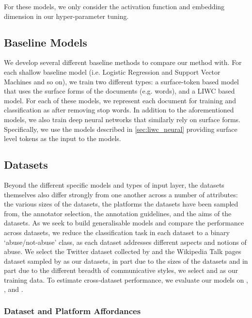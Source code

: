 For these models, we only consider the activation function and embedding dimension in our hyper-parameter tuning.

\subsection{Baseline Models}

We develop several different baseline methods to compare our method with. For each shallow baseline model (i.e. Logistic Regression and Support Vector Machines and so on), we train two different types: a surface-token based model that uses the surface forms of the documents (e.g. words), and a LIWC based model. For each of these models, we represent each document for training and classification as  after removing stop words. In addition to the aforementioned models, we also train deep neural networks that similarly rely on surface forms. Specifically, we use the models described in \autoref{sec:liwc_neural} providing surface level tokens as the input to the models.

\subsection{Datasets}
Beyond the different specific models and types of input layer, the datasets themselves also differ strongly from one another across a number of attributes: the various sizes of the datasets, the platforms the datasets have been sampled from, the annotator selection, the annotation guidelines, and the aims of the datasets. As we seek to build generalisable models and compare the performance across datasets, we reduce the classification task in each dataset to a binary `abuse/not-abuse' class, as each dataset addresses different aspects and notions of abuse. We select the Twitter dataset collected by \citet{Davidson:2017} and the Wikipedia Talk pages dataset sampled by \citet{Wulczyn:2017} as our datasets, in part due to the sizes of the datasets and in part due to the different breadth of communicative styles, we select \citet{Davidson:2017} and \citet{Wulczyn:2017} as our training data. To estimate cross-dataset performance, we evaluate our models on \citet{Waseem-Hovy:2016}, \citet{Waseem:2016}, and \citet{Garcia:2019}.


\subsubsection{Dataset and Platform Affordances}

